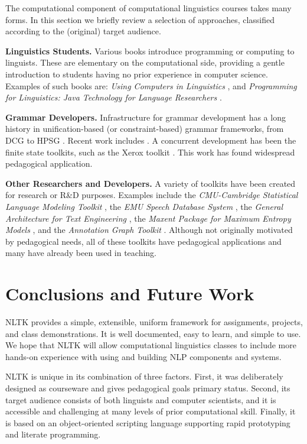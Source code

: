 \documentclass[11pt]{article}
\begin{document}
The computational component of computational linguistics courses takes
many forms.  In this section we briefly review a selection of approaches,
classified according to the (original) target audience.

{\bf Linguistics Students.}
Various books introduce programming or computing to linguists.
These are elementary on the computational side, providing a
gentle introduction to students having no prior experience
in computer science.  Examples of such books are:
\emph{Using Computers in Linguistics}
\cite{Lawler98}, and
\emph{Programming for Linguistics: Java Technology for Language
Researchers} \cite{Hammond02}.

{\bf Grammar Developers.}
Infrastructure for grammar development has a long history in
unification-based (or constraint-based) grammar frameworks, from DCG
\cite{PereiraWarren80} to HPSG \cite{PollardSag94}.  Recent work includes
\cite{Copestake00,Baldridge02}.  A concurrent development has been the
finite state toolkits, such as the Xerox toolkit \cite{Beesley02}.  This
work has found widespread pedagogical application.

{\bf Other Researchers and Developers.}
A variety of toolkits have been created for research or R\&D
purposes.  Examples include
the \emph{CMU-Cambridge Statistical Language Modeling Toolkit}
\cite{Clarkson97},
the \emph{EMU Speech Database System} \cite{Harrington99},
the \emph{General Architecture for Text Engineering} \cite{Bontcheva02},
the \emph{Maxent Package for Maximum Entropy Models} \cite{maxent},
and the \emph{Annotation Graph Toolkit} \cite{MaedaBird02}.
Although not originally motivated by pedagogical needs, all of these
toolkits have pedagogical applications and many have already been
used in teaching.

\section{Conclusions and Future Work}
\label{sec:conclusion}

NLTK provides a simple, extensible, uniform framework for assignments,
projects, and class demonstrations.  It is well documented, easy to
learn, and simple to use.  We hope that NLTK will allow computational
linguistics classes to include more hands-on experience with using and
building NLP components and systems.

NLTK is unique in its combination of three factors.
First, it was deliberately designed as courseware and gives pedagogical
goals primary status.  Second, its target audience consists of both
linguists and computer scientists, and it is accessible and challenging
at many levels of prior computational skill.  Finally, it is based on
an object-oriented scripting language supporting rapid prototyping and
literate programming.
\end{document}
